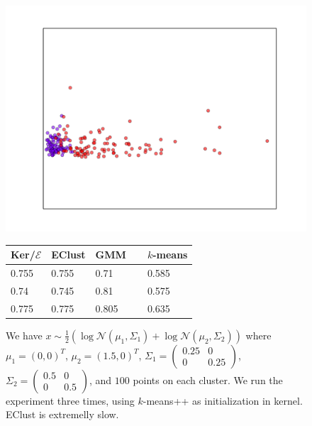\documentclass[aps,preprint,nofootinbib,floatfix]{revtex4-1}
\begin{document}
\begin{figure}[h]
\begin{minipage}{.49\textwidth}
\includegraphics[scale=.45]{loggauss1.pdf}
\end{minipage}
\begin{minipage}{.49\textwidth}
\begin{tabular}{ l l l l}
\hline
Ker/$\mathcal{E}$ & EClust & GMM~~ & $k$-means \\
\hline
0.755 &
0.755 &
0.71 &
0.585 \\
0.74 &
0.745 &
0.81 &
0.575 \\
0.775 &
0.775 &
0.805 &
0.635 \\
\hline
\end{tabular}
\end{minipage}
\caption{\label{fig:1dloggaus1}
We have $x \sim \tfrac{1}{2}\left( \log \mathcal{N}(\mu_1, \Sigma_1) +
\log \mathcal{N}(\mu_2, \Sigma_2)\right)$ where $\mu_1 = (0,0)^T$, 
$\mu_2=(1.5, 0)^T$,
$\Sigma_1 = 
\left( \begin{smallmatrix} 
0.25 & 0 \\ 0 & 0.25 
\end{smallmatrix} \right)$, 
$\Sigma_2 = 
\left( \begin{smallmatrix} 
0.5 & 0 \\ 0 & 0.5 
\end{smallmatrix} \right)$, 
and $100$ points on each cluster. We run the experiment three times,
using $k$-means++ as initialization in kernel. EClust is extremelly slow.
}
\end{figure}
\end{document}

